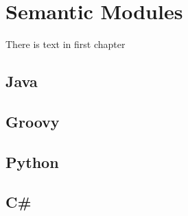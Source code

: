 \chapter{Semantic Modules}
There is text in first chapter

\section{Java}

\section{Groovy}

\section{Python}

\section{C\#}
 

